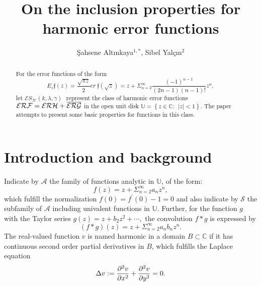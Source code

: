 \documentclass[12pt,reqno]{amsart}
\begin{document}
\title[Harmonic error functions]{On the inclusion properties for harmonic
error functions}

\begin{abstract}
For the error functions of the form
\begin{equation*}
E_{r}\mathfrak{f}(z)=\frac{\sqrt{\pi z}}{2}er\ \mathfrak{f}(\sqrt{z})=z+\Sigma_{n=2}^{\infty} \frac{(-1)^{n-1}}{(2n-1)(n-1)!}z^{n},
\end{equation*}%
let $\mathcal{E}S_{\mathcal{H}}(k,\lambda ,\gamma )\,$\ represent the class
of harmonic error functions $\mathcal{ERF}=\mathcal{ERH}+\overline{\mathcal{%
ERG}}$ in the open unit disk $\mathbb{U}=\left\{ z\in \mathbb{C}:\ \
\left\vert z\right\vert <1\right\} $. The paper attempts to
present some basic properties for functions
in this class.
\end{abstract}

\author[\c{S}. Alt\i nkaya, S. Yal\c{c}\i n]{\c{S}ahsene Alt\i nkaya$^{1,\ast }$, Sibel Yal\c{c}\i n$^{2}$}
\address{$^{1}$Department of Mathematics and Statistics, Faculty of Science, Turku University, 20014, Turku, Finland \\
\newline $^{2}$Department of Mathematics, Faculty of Arts and
Science, Bursa Uludag University, 16059, G\"{o}r\"{u}kle, Bursa, Türkiye}
\email{sahsenealtinkaya@gmail.com}
\maketitle

\section{Introduction and background}

\thispagestyle{empty}Indicate by $\mathcal{A}$ the family of functions
analytic in $\mathbb{U}$, of the form: 
\begin{equation}
f(z)=z+\Sigma_{n=2}^{\infty}a_{n}z^{n},  \label{eq1}
\end{equation}%
which fulfill the normalization $f(0)=f^{\prime }(0)-1=0$ and also indicate by $\mathcal{S}$ the subfamily of $\mathcal{A}$ including univalent functions in $\mathbb{U}$. Further, for the function $g$ with the Taylor series $g(z)=z+b_{2}z^{2}+\cdots ,$ the
convolution $f\ast g$ is expressed by
\begin{equation*}
\left( f\ast g\right) (z)=z+\Sigma_{n=2}^{\infty}
a_{n}b_{n}z^{n}.
\end{equation*}%
The real-valued function $v$ is named harmonic in a domain $B\subset \mathbb{C}$ if it has continuous second order partial derivatives in $B$, which
fulfills the Laplace equation 
\begin{equation*}
\Delta v:=\frac{\partial ^{2}v}{\partial x^{2}}+\frac{\partial ^{2}v}{%
\partial y^{2}}=0.
\end{equation*}
\end{document}
